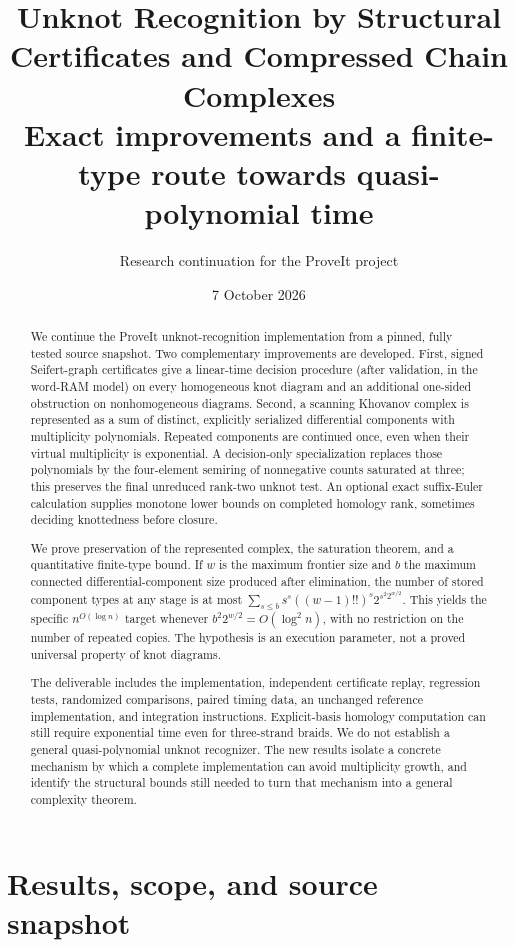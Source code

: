 \documentclass[11pt,letterpaper]{article}
\title{\textcolor{ink}{Unknot Recognition by Structural Certificates\newline
and Compressed Chain Complexes}\\[6pt]
\large Exact improvements and a finite-type route towards quasi-polynomial time}
\author{Research continuation for the ProveIt project}
\date{7 October 2026}
\begin{document}
\maketitle
\begin{abstract}
We continue the ProveIt unknot-recognition implementation from a pinned,
fully tested source snapshot. Two complementary improvements are developed.
First, signed Seifert-graph certificates give a linear-time decision procedure
(after validation, in the word-RAM model) on every homogeneous knot diagram and an additional one-sided obstruction
on nonhomogeneous diagrams. Second, a scanning Khovanov complex is represented
as a sum of distinct, explicitly serialized differential components with
multiplicity polynomials. Repeated components are continued once, even when
their virtual multiplicity is exponential. A decision-only specialization
replaces those polynomials by the four-element semiring of nonnegative counts
saturated at three; this preserves the final unreduced rank-two unknot test.
An optional exact suffix-Euler calculation supplies monotone lower bounds on
completed homology rank, sometimes deciding knottedness before closure.

We prove preservation of the represented complex, the saturation theorem,
and a quantitative finite-type bound. If $w$ is the maximum frontier size and
$b$ the maximum connected differential-component size produced after
elimination, the number of stored component types at any stage is at most
$\sum_{s\le b}s^s((w-1)!!)^s2^{s^2 2^{w/2}}$. This yields the specific
$n^{O(\log n)}$ target whenever $b^2 2^{w/2}=O(\log^2 n)$, with no restriction
on the number of repeated copies. The hypothesis is an execution parameter,
not a proved universal property of knot diagrams.

The deliverable includes the implementation, independent certificate replay,
regression tests, randomized comparisons, paired timing data, an unchanged
reference implementation, and integration instructions. Explicit-basis
homology computation can still require exponential time even for
three-strand braids. We do not establish a general quasi-polynomial unknot
recognizer. The new results isolate a concrete mechanism by which a complete
implementation can avoid multiplicity growth, and identify the structural
bounds still needed to turn that mechanism into a general complexity theorem.
\end{abstract}
\clearpage
{\fontsize{9.5}{11}\selectfont\tableofcontents}
\newpage

\section{Results, scope, and source snapshot}
\label{sec:scope}
\end{document}
